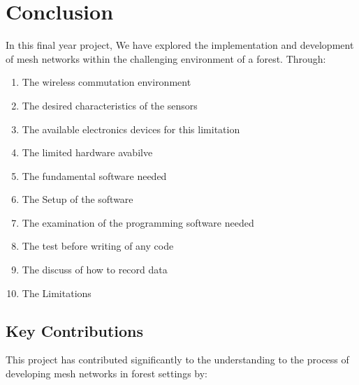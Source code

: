\section{Conclusion}
\label{ch:conclusion} %
In this final year project, We have explored the implementation and development of mesh networks within the challenging environment of a forest. Through:
\begin{enumerate}
    \item The wireless commutation environment 
    \item The desired characteristics of the sensors
    \item The available electronics devices for this limitation
    \item The limited hardware avabilve
    \item The  fundamental software needed
    \item The Setup of the software
    \item The examination of the programming software needed
    \item The test before writing of any code 
    \item The discuss of how to record data
    \item The Limitations
\end{enumerate}
\subsection{Key Contributions}

This project has contributed significantly to the understanding to the process of developing mesh networks in forest settings by:


